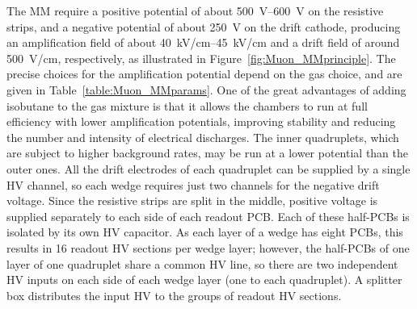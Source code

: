 \documentclass[cernpreprint, atlasdraft=false, UKenglish,british,orcidlogo, texmf, orcidlogo]{atlasdoc}
\begin{document}
The \gls{MM} require a positive potential of about \SIrange{500}{600}{\volt} on the resistive strips, and a negative potential of
about \SI{250}{\volt} 
on the drift cathode, producing an amplification field of about \SIrange{40}{45}{\kilo\volt/\cm} and a drift field of around 
\SI{500}{\volt/\cm},
respectively, as illustrated in Figure~\ref{fig:Muon_MMprinciple}.
The precise choices for the amplification potential depend on the gas choice, and are given in Table~\ref{table:Muon_MMparams}.
One of the great advantages of adding isobutane to the gas mixture is that it allows the chambers to run at full efficiency with lower amplification potentials, improving stability and reducing the number and intensity of electrical discharges.
The inner quadruplets, which are subject to higher background rates, may be run at a lower potential than the outer ones.
All the drift electrodes of each quadruplet can be supplied by a single \gls{HV} channel,
so each wedge requires just two channels for the negative drift voltage.
Since the resistive strips are split in the middle, positive voltage is supplied separately to each side of each readout \gls{PCB}. Each of these half-\glspl{PCB} is isolated by its own \gls{HV} capacitor.
As each layer of a wedge has eight \glspl{PCB}, this results in \num{16} readout \gls{HV} sections per wedge layer; however, the half-\glspl{PCB} of one layer of one quadruplet share a common \gls{HV} line, so there are two independent \gls{HV} inputs on each side of each wedge layer (one to each quadruplet). A splitter box distributes the input \gls{HV} to the groups of readout \gls{HV} sections.
 
\end{document}
